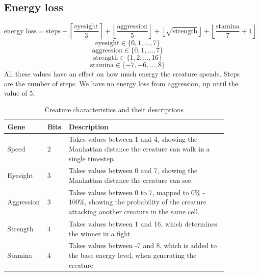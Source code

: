 \documentclass{article}
\begin{document}
\subsection{Energy loss}
\[\text{energy loss}=\text{steps}+\left\lceil\frac{\text{eyesight}}{3}\right\rceil+\left\lfloor\frac{\text{aggression}}{5}\right\rfloor+\left\lfloor\sqrt{\text{strength}}\right\rfloor+\left\lfloor\frac{\text{stamina}}{7}+1\right\rfloor\]
\[\text{eyesight}\in\{0,1,...,7\}\]
\[\text{aggression}\in\{0,1,...,7\}\]
\[\text{strength}\in\{1,2,...,16\}\]
\[\text{stamina}\in\{-7,-6,...,8\}\]
All these values have an effect on how much energy the creature spends. Steps are the number of steps. We have no energy loss from aggression, up until the value of 5.
\begin{table}[H]
\begin{center}
    \begin{tabular}{|p{0.11\linewidth} |p{0.08\linewidth}|p{0.7\linewidth}|}
    \hline
    Gene & Bits & Description  \\\hline
    Speed & 2 & Takes values between 1 and 4, showing the Manhattan distance the creature can walk in a single timestep.\\\hline
    Eyesight & 3 & Takes values between 0 and 7, showing the Manhattan distance the creature can see.\\\hline
    Aggression & 3 & Takes values between 0 to 7, mapped to 0\% - 100\%, showing the probability of the creature attacking another creature in the same cell. \\\hline
    Strength & 4 & Takes values between 1 and 16, which determines the winner in a fight \\\hline
    Stamina & 4 & Takes values between -7 and 8, which is added to the base energy level, when generating the creature\\\hline
\end{tabular}
\caption{Creature characteristics and their descriptions}
\end{center}
\end{table}
\end{document}
